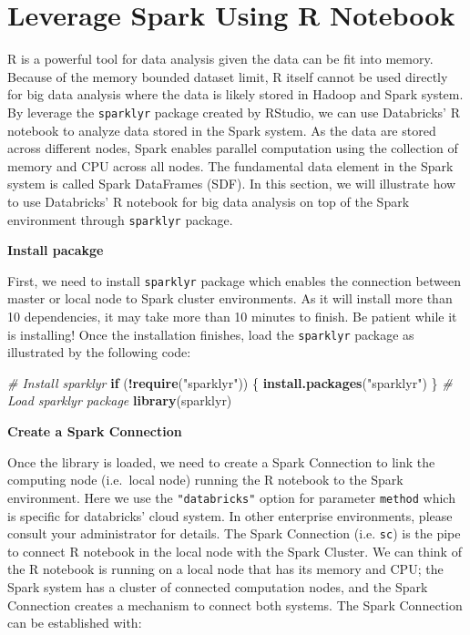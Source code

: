 \documentclass[12pt,]{krantz}
\makeatletter
\newenvironment{Shaded}{\begin{snugshade}}{\end{snugshade}}
\newcommand{\CommentTok}[1]{\textcolor[rgb]{0.37,0.37,0.37}{\textit{#1}}}
\newcommand{\ControlFlowTok}[1]{\textcolor[rgb]{0.27,0.27,0.27}{\textbf{#1}}}
\newcommand{\KeywordTok}[1]{\textcolor[rgb]{0.27,0.27,0.27}{\textbf{#1}}}
\newcommand{\NormalTok}[1]{#1}
\newcommand{\OperatorTok}[1]{\textcolor[rgb]{0.43,0.43,0.43}{\textbf{#1}}}
\newcommand{\StringTok}[1]{\textcolor[rgb]{0.5,0.5,0.5}{#1}}
\newenvironment{kframe}{%
\medskip{}
\setlength{\fboxsep}{.8em}
 \def\at@end@of@kframe{}%
 \ifinner\ifhmode%
  \def\at@end@of@kframe{\end{minipage}}%
  \begin{minipage}{\columnwidth}%
 \fi\fi%
 \def\FrameCommand##1{\hskip\@totalleftmargin \hskip-\fboxsep
 \colorbox{shadecolor}{##1}\hskip-\fboxsep
     \hskip-\linewidth \hskip-\@totalleftmargin \hskip\columnwidth}%
 \MakeFramed {\advance\hsize-\width
   \@totalleftmargin\z@ \linewidth\hsize
   \@setminipage}}%
 {\par\unskip\endMakeFramed%
 \at@end@of@kframe}
\renewenvironment{Shaded}{\begin{kframe}}{\end{kframe}}
\makeatother
\begin{document}
\hypertarget{leverage-spark-using-r-notebook}{%
\section{Leverage Spark Using R Notebook}\label{leverage-spark-using-r-notebook}}

R is a powerful tool for data analysis given the data can be fit into memory. Because of the memory bounded dataset limit, R itself cannot be used directly for big data analysis where the data is likely stored in Hadoop and Spark system. By leverage the \texttt{sparklyr} package created by RStudio, we can use Databricks' R notebook to analyze data stored in the Spark system. As the data are stored across different nodes, Spark enables parallel computation using the collection of memory and CPU across all nodes. The fundamental data element in the Spark system is called Spark DataFrames (SDF). In this section, we will illustrate how to use Databricks' R notebook for big data analysis on top of the Spark environment through \texttt{sparklyr} package.

\textbf{Install pacakge}

First, we need to install \texttt{sparklyr} package which enables the connection between master or local node to Spark cluster environments. As it will install more than 10 dependencies, it may take more than 10 minutes to finish. Be patient while it is installing! Once the installation finishes, load the \texttt{sparklyr} package as illustrated by the following code:

\begin{Shaded}
\begin{Highlighting}[]
\CommentTok{# Install sparklyr}
\ControlFlowTok{if}\NormalTok{ (}\OperatorTok{!}\KeywordTok{require}\NormalTok{(}\StringTok{"sparklyr"}\NormalTok{)) \{}
\KeywordTok{install.packages}\NormalTok{(}\StringTok{"sparklyr"}\NormalTok{)}
\NormalTok{\}}
\CommentTok{# Load sparklyr package}
\KeywordTok{library}\NormalTok{(sparklyr)}
\end{Highlighting}
\end{Shaded}

\textbf{Create a Spark Connection}

Once the library is loaded, we need to create a Spark Connection to link the computing node (i.e.~local node) running the R notebook to the Spark environment. Here we use the \texttt{"databricks"} option for parameter \texttt{method} which is specific for databricks' cloud system. In other enterprise environments, please consult your administrator for details. The Spark Connection (i.e. \texttt{sc}) is the pipe to connect R notebook in the local node with the Spark Cluster. We can think of the R notebook is running on a local node that has its memory and CPU; the Spark system has a cluster of connected computation nodes, and the Spark Connection creates a mechanism to connect both systems. The Spark Connection can be established with:
\end{document}
